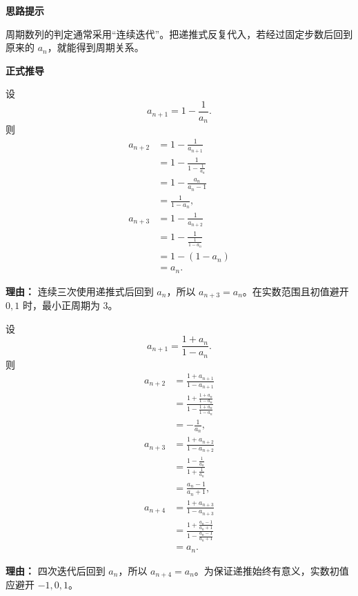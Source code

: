 \begin{proofbox}
	\textbf{\textcolor{CProof}{思路提示}}

	周期数列的判定通常采用“连续迭代”。把递推式反复代入，若经过固定步数后回到原来的 \(a_n\)，就能得到周期关系。

	\medskip
	\textbf{\textcolor{CProof}{正式推导}}
	\begin{description}[style=nextline, leftmargin=2.8em, labelsep=0.5em, itemsep=0.55em]
		\item[\textbf{步骤一（递推一验证）：}]
		      设
		      \[
			      a_{n+1}=1-\frac1{a_n}.
		      \]
		      则
		      \[
			      \begin{aligned}
				      a_{n+2}
				       & =1-\frac1{a_{n+1}}       \\[2pt]
				       & =1-\frac1{1-\frac1{a_n}} \\[2pt]
				       & =1-\frac{a_n}{a_n-1}     \\[2pt]
				       & =\frac1{1-a_n},          \\[4pt]
				      a_{n+3}
				       & =1-\frac1{a_{n+2}}       \\[2pt]
				       & =1-\frac1{\frac1{1-a_n}} \\[2pt]
				       & =1-(1-a_n)               \\[2pt]
				       & =a_n.
			      \end{aligned}
		      \]
		      \par\textbf{理由：} 连续三次使用递推式后回到 \(a_n\)，所以 \(a_{n+3}=a_n\)。在实数范围且初值避开 \(0,1\) 时，最小正周期为 \(3\)。

		\item[\textbf{步骤二（递推二验证）：}]
		      设
		      \[
			      a_{n+1}=\frac{1+a_n}{1-a_n}.
		      \]
		      则
		      \[
			      \begin{aligned}
				      a_{n+2}
				       & =\frac{1+a_{n+1}}{1-a_{n+1}}                         \\[2pt]
				       & =\frac{1+\frac{1+a_n}{1-a_n}}{1-\frac{1+a_n}{1-a_n}} \\[2pt]
				       & =-\frac1{a_n},                                       \\[4pt]
				      a_{n+3}
				       & =\frac{1+a_{n+2}}{1-a_{n+2}}                         \\[2pt]
				       & =\frac{1-\frac1{a_n}}{1+\frac1{a_n}}                 \\[2pt]
				       & =\frac{a_n-1}{a_n+1},                                \\[4pt]
				      a_{n+4}
				       & =\frac{1+a_{n+3}}{1-a_{n+3}}                         \\[2pt]
				       & =\frac{1+\frac{a_n-1}{a_n+1}}{1-\frac{a_n-1}{a_n+1}} \\[2pt]
				       & =a_n.
			      \end{aligned}
		      \]
		      \par\textbf{理由：} 四次迭代后回到 \(a_n\)，所以 \(a_{n+4}=a_n\)。为保证递推始终有意义，实数初值应避开 \(-1,0,1\)。


\end{description}
\end{proofbox}
